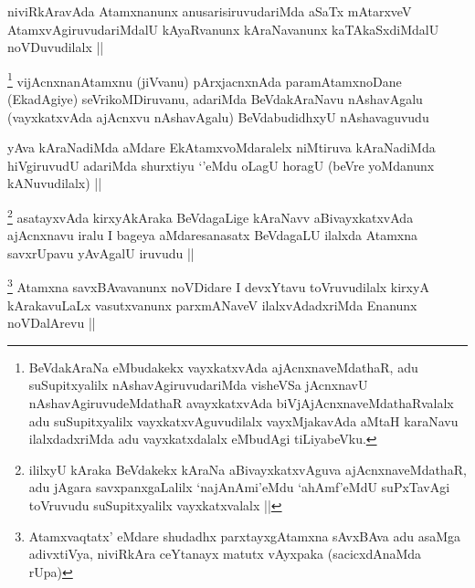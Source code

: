 \begin{artha}
niviRkAravAda Atamxnanunx anusarisiruvudariMda aSaTx mAtarxveV AtamxvAgiruvudariMdalU kAyaRvanunx kAraNavanunx kaTAkaSxdiMdalU noVDuvudilalx ||
\end{artha}



\begin{artha}
\footnote{BeVdakAraNa eMbudakekx vayxkatxvAda ajAcnxnaveMdathaR, adu suSupitxyalilx nAshavAgiruvudariMda visheVSa jAcnxnavU nAshavAgiruvudeMdathaR avayxkatxvAda biVjAjAcnxnaveMdathaRvalalx adu suSupitxyalilx vayxkatxvAguvudilalx vayxMjakavAda aMtaH karaNavu ilalxdadxriMda adu vayxkatxdalalx eMbudAgi tiLiyabeVku.}
vijAcnxnanAtamxnu (jiVvanu) pArxjacnxnAda paramAtamxnoDane (EkadAgiye) seVrikoMDiruvanu, adariMda BeVdakAraNavu nAshavAgalu (vayxkatxvAda ajAcnxvu nAshavAgalu) BeVdabudidhxyU nAshavaguvudu 
\end{artha}

\begin{artha}
yAva kAraNadiMda aMdare EkAtamxvoMdaralelx niMtiruva kAraNadiMda hiVgiruvudU adariMda shurxtiyu `\stext'eMdu oLagU horagU (beVre yoMdanunx kANuvudilalx) ||
\end{artha}


\begin{artha}
\footnote{ililxyU kAraka BeVdakekx kAraNa aBivayxkatxvAguva ajAcnxnaveMdathaR, adu jAgara savxpanxgaLalilx `najAnAmi'eMdu `ahAmf'eMdU suPxTavAgi toVruvudu suSupitxyalilx vayxkatxvalalx ||}
asatayxvAda kirxyAkAraka BeVdagaLige kAraNavv aBivayxkatxvAda ajAcnxnavu iralu I bageya aMdaresanasatx BeVdagaLU ilalxda Atamxna savxrUpavu yAvAgalU iruvudu ||
\end{artha}

\begin{artha}
\footnote{Atamxvaqtatx' eMdare shudadhx parxtayxgAtamxna sAvxBAva adu asaMga adivxtiVya, niviRkAra ceYtanayx matutx vAyxpaka (sacicxdAnaMda rUpa)}
Atamxna savxBAvavanunx noVDidare I devxYtavu toVruvudilalx kirxyA kArakavuLaLx vasutxvanunx parxmANaveV ilalxvAdadxriMda Enanunx noVDalArevu ||
\end{artha}


